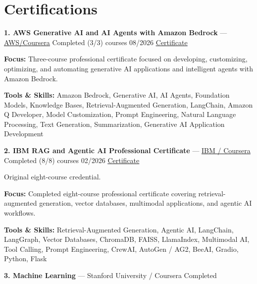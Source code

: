 \documentclass[9pt,letterpaper]{extarticle}
\begin{document}
\section{Certifications}
\noindent\textbf{1. AWS Generative AI and AI Agents with Amazon Bedrock} {\small --- \textcolor{blue}{\underline{\href{https://coursera.org/verify/professional-cert/XMNOUZNOW9M0}{AWS/Coursera}}} \textbar{} Completed (3/3) courses \textbar{} 08/2026 \textbar{} \textcolor{blue}{\underline{\href{https://waseemraza844.github.io/portfolio/certificates/genai/aws-bedrock/aws-generative-ai-agents-amazon-bedrock.pdf}{Certificate}}}}\par
\textbf{Focus:} Three-course professional certificate focused on developing, customizing, optimizing, and automating generative AI applications and intelligent agents with Amazon Bedrock.\par
{\small\textbf{Tools \& Skills:} Amazon Bedrock, Generative AI, AI Agents, Foundation Models, Knowledge Bases, Retrieval-Augmented Generation, LangChain, Amazon Q Developer, Model Customization, Prompt Engineering, Natural Language Processing, Text Generation, Summarization, Generative AI Application Development\par}
\vspace{2pt}
\noindent\textbf{2. IBM RAG and Agentic AI Professional Certificate} {\small --- \textcolor{blue}{\underline{\href{https://coursera.org/verify/professional-cert/0CB713GHZC1B}{IBM / Coursera}}} \textbar{} Completed (8/8) courses \textbar{} 02/2026 \textbar{} \textcolor{blue}{\underline{\href{https://waseemraza844.github.io/portfolio/certificates/genai/ibm-rag-agentic-ai/ibm-rag-agentic-ai-professional-certificate.pdf}{Certificate}}}}\par
{\small Original eight-course credential.\par}
\textbf{Focus:} Completed eight-course professional certificate covering retrieval-augmented generation, vector databases, multimodal applications, and agentic AI workflows.\par
{\small\textbf{Tools \& Skills:} Retrieval-Augmented Generation, Agentic AI, LangChain, LangGraph, Vector Databases, ChromaDB, FAISS, LlamaIndex, Multimodal AI, Tool Calling, Prompt Engineering, CrewAI, AutoGen / AG2, BeeAI, Gradio, Python, Flask\par}
\vspace{2pt}
\noindent\textbf{3. Machine Learning} {\small --- Stanford University / Coursera \textbar{} Completed}\par
\end{document}
